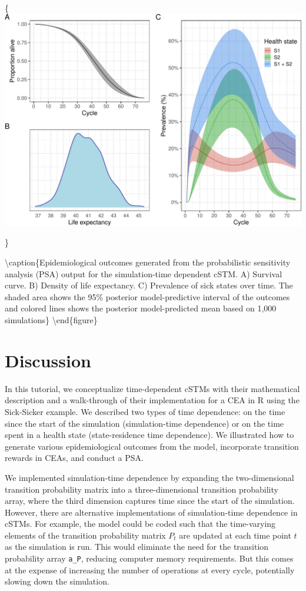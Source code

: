 \documentclass[
]{article}
\begin{document}
\{\centering \includegraphics{figs/PSA-EPI-figures-1}

\}

\textbackslash caption\{Epidemiological outcomes generated from the probabilistic sensitivity analysis (PSA) output for the simulation-time dependent cSTM. A) Survival curve. B) Density of life expectancy. C) Prevalence of sick states over time. The shaded area shows the 95\% posterior model-predictive interval of the outcomes and colored lines shows the posterior model-predicted mean based on 1,000 simulations\}\label{fig:PSA-EPI-figures}
\textbackslash end\{figure\}

\hypertarget{discussion}{%
\section{Discussion}\label{discussion}}

In this tutorial, we conceptualize time-dependent cSTMs with their mathematical description and a walk-through of their implementation for a CEA in R using the Sick-Sicker example. We described two types of time dependence: on the time since the start of the simulation (simulation-time dependence) or on the time spent in a health state (state-residence time dependence). We illustrated how to generate various epidemiological outcomes from the model, incorporate transition rewards in CEAs, and conduct a PSA.

We implemented simulation-time dependence by expanding the two-dimensional transition probability matrix into a three-dimensional transition probability array, where the third dimension captures time since the start of the simulation. However, there are alternative implementations of simulation-time dependence in cSTMs. For example, the model could be coded such that the time-varying elements of the transition probability matrix \(P_t\) are updated at each time point \(t\) as the simulation is run. This would eliminate the need for the transition probability array \texttt{a\_P}, reducing computer memory requirements. But this comes at the expense of increasing the number of operations at every cycle, potentially slowing down the simulation.
\end{document}
